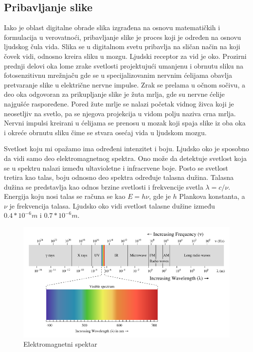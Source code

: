 \documentclass[a4paper,12pt,titlepage]{article}
\begin{document}
\subsection{Pribavljanje slike}%

Iako je oblast digitalne obrade slika izgrađena na osnovu matematičkih i formulacija u verovatnoći, pribavljanje slike je proces koji je određen na osnovu ljudskog čula vida. Slika se u digitalnom svetu pribavlja na sličan način na koji čovek vidi, odnosno kreira sliku u mozgu. Ljudski receptor za vid je oko. Prozirni prednji delovi oka lome zrake svetlosti projektujući umanjenu i obrnutu sliku na fotosenzitivnu mrežnjaču gde se u specijalizovanim nervnim ćelijama obavlja pretvaranje slike u električne nervne impulse. Zrak se prelama u očnom sočivu, a deo oka odgovoran za prikupljanje slike je žuta mrlja, gde su nervne ćelije najgušće raspoređene. Pored žute mrlje se nalazi početak vidnog živca koji je neosetljiv na svetlo, pa se njegova projekcija u vidom polju naziva crna mrlja. Nervni impulsi kreirani u ćelijama se prenosu u mozak koji spaja slike iz oba oka i okreće obrnutu sliku čime se stvara osećaj vida u ljudskom mozgu.

Svetlost koju mi opažamo ima određeni intenzitet i boju. Ljudsko oko je sposobno da vidi samo deo elektromagnetnog spektra. Ono može da detektuje svetlost koja se u spektru nalazi između ultavioletne i infracrvene boje. Posto se svetlost tretira kao talas, boju odnosno deo spektra određuje talasna dužina. Talasna dužina se predstavlja kao odnos brzine svetlosti i frekvencije svetla $\lambda = c / \nu$. Energija koju nosi talas se računa se kao $E = h \nu$, gde je $h$ Plankova konstanta, a $\nu$ je frekvencija talasa. Ljudsko oko vidi svetlost talasne dužine između $0.4 * 10^{-6}m$ i $0.7 * 10^{-6}m$.

\begin{figure}[ht!]
\centering
\includegraphics[width=120mm]{img/spektar.png}
\caption{Elektromagnetni spektar}
\label{spektar}
\end{figure} 
\end{document}
